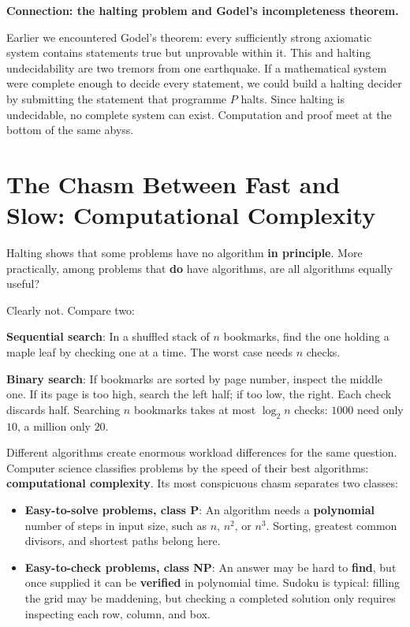 \begin{lianjie}
\textbf{Connection: the halting problem and Godel's incompleteness theorem.}

Earlier we encountered Godel's theorem: every sufficiently strong axiomatic system contains statements true but unprovable within it. This and halting undecidability are two tremors from one earthquake. If a mathematical system were complete enough to decide every statement, we could build a halting decider by submitting the statement that programme $P$ halts. Since halting is undecidable, no complete system can exist. Computation and proof meet at the bottom of the same abyss.
\end{lianjie}

\section{The Chasm Between Fast and Slow: Computational Complexity}

Halting shows that some problems have no algorithm \textbf{in principle}. More practically, among problems that \textbf{do} have algorithms, are all algorithms equally useful?

Clearly not. Compare two:

\textbf{Sequential search}: In a shuffled stack of $n$ bookmarks, find the one holding a maple leaf by checking one at a time. The worst case needs $n$ checks.

\textbf{Binary search}: If bookmarks are sorted by page number, inspect the middle one. If its page is too high, search the left half; if too low, the right. Each check discards half. Searching $n$ bookmarks takes at most $\log_2 n$ checks: $1000$ need only $10$, a million only $20$.

Different algorithms create enormous workload differences for the same question. Computer science classifies problems by the speed of their best algorithms: \textbf{computational complexity}. Its most conspicuous chasm separates two classes:

\begin{itemize}
\item \textbf{Easy-to-solve problems, class P}: An algorithm needs a \textbf{polynomial} number of steps in input size, such as $n$, $n^2$, or $n^3$. Sorting, greatest common divisors, and shortest paths belong here.
\item \textbf{Easy-to-check problems, class NP}: An answer may be hard to \textbf{find}, but once supplied it can be \textbf{verified} in polynomial time. Sudoku is typical: filling the grid may be maddening, but checking a completed solution only requires inspecting each row, column, and box.
\end{itemize}

